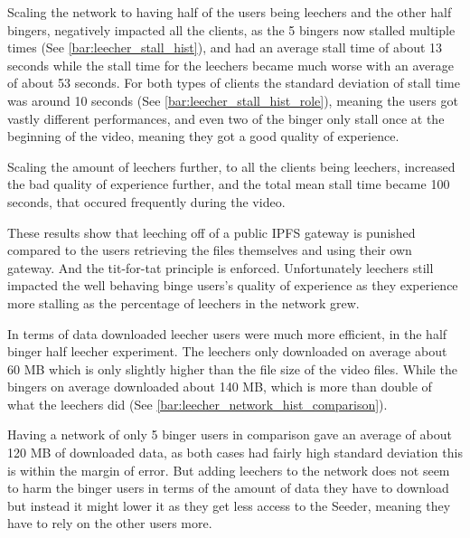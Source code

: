Scaling the network to having half of the users being leechers and the other half bingers, negatively impacted all the clients, as the 5 bingers now stalled multiple times (See \autoref{bar:leecher_stall_hist}), and had an average stall time of about 13 seconds while the stall time for the leechers became much worse with an average of about 53 seconds. For both types of clients the standard deviation of stall time was around 10 seconds (See \autoref{bar:leecher_stall_hist_role}), meaning the users got vastly different performances, and even two of the binger only stall once at the beginning of the video, meaning they got a good quality of experience.






%

Scaling the amount of leechers further, to all the clients being leechers, increased the bad quality of experience further, and the total mean stall time became 100 seconds, that occured frequently during the video.

These results show that leeching off of a public \ac{IPFS} gateway is punished compared to the users retrieving the files themselves and using their own gateway. And the tit-for-tat principle is enforced. Unfortunately leechers still impacted the well behaving binge users's quality of experience as they experience more stalling as the percentage of leechers in the network grew.

In terms of data downloaded leecher users were much more efficient, in the half binger half leecher experiment. The leechers only downloaded on average about 60 \ac{MB} which is only slightly higher than the file size of the video files. While the bingers on average downloaded about 140 \ac{MB}, which is more than double of what the leechers did (See \autoref{bar:leecher_network_hist_comparison}). 


Having a network of only 5 binger users in comparison gave an average of about 120 \ac{MB} of downloaded data, as both cases had fairly high standard deviation this is within the margin of error. But adding leechers to the network does not seem to harm the binger users in terms of the amount of data they have to download but instead it might lower it as they get less access to the Seeder, meaning they have to rely on the other users more.

